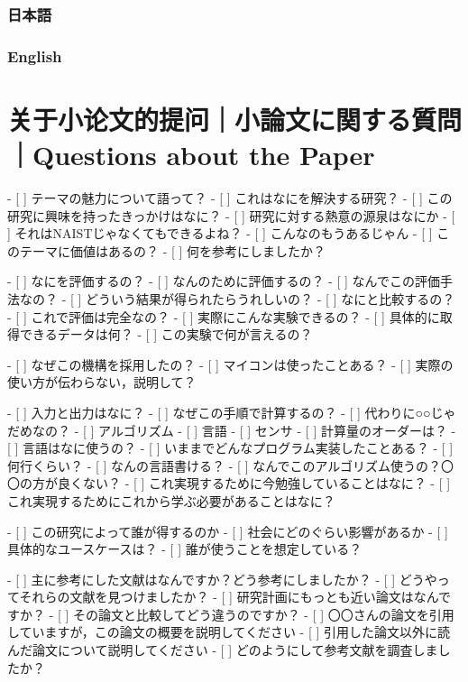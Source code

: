 \documentclass[lang=cn,11pt,a4paper]{elegantpaper}
\begin{document}
\subsubsection{日本語}
\subsubsection{English}
\section{关于小论文的提问｜小論文に関する質問｜Questions about the Paper}


- [ ]  テーマの魅力について語って？
- [ ]  これはなにを解決する研究？
- [ ]  この研究に興味を持ったきっかけはなに？
- [ ]  研究に対する熱意の源泉はなにか
- [ ]  それはNAISTじゃなくてもできるよね？
- [ ]  こんなのもうあるじゃん
- [ ]  このテーマに価値はあるの？
- [ ]  何を参考にしましたか？



- [ ]  なにを評価するの？
- [ ]  なんのために評価するの？
- [ ]  なんでこの評価手法なの？
- [ ]  どういう結果が得られたらうれしいの？
- [ ]  なにと比較するの？
- [ ]  これで評価は完全なの？
- [ ]  実際にこんな実験できるの？
- [ ]  具体的に取得できるデータは何？
- [ ]  この実験で何が言えるの？



- [ ]  なぜこの機構を採用したの？
- [ ]  マイコンは使ったことある？
- [ ]  実際の使い方が伝わらない，説明して？



- [ ]  入力と出力はなに？
- [ ]  なぜこの手順で計算するの？
- [ ]  代わりに○○じゃだめなの？
- [ ]  アルゴリズム
- [ ]  言語
- [ ]  センサ
- [ ]  計算量のオーダーは？
- [ ]  言語はなに使うの？
- [ ]  いままでどんなプログラム実装したことある？
- [ ]  何行くらい？
- [ ]  なんの言語書ける？
- [ ]  なんでこのアルゴリズム使うの？〇〇の方が良くない？
- [ ]  これ実現するために今勉強していることはなに？
- [ ]  これ実現するためにこれから学ぶ必要があることはなに？



- [ ]  この研究によって誰が得するのか
- [ ]  社会にどのぐらい影響があるか
- [ ]  具体的なユースケースは？
- [ ]  誰が使うことを想定している？


- [ ]  主に参考にした文献はなんですか？どう参考にしましたか？
- [ ]  どうやってそれらの文献を見つけましたか？
- [ ]  研究計画にもっとも近い論文はなんですか？
- [ ]  その論文と比較してどう違うのですか？
- [ ]  〇〇さんの論文を引用していますが，この論文の概要を説明してください
- [ ]  引用した論文以外に読んだ論文について説明してください
- [ ]  どのようにして参考文献を調査しましたか？
\end{document}
